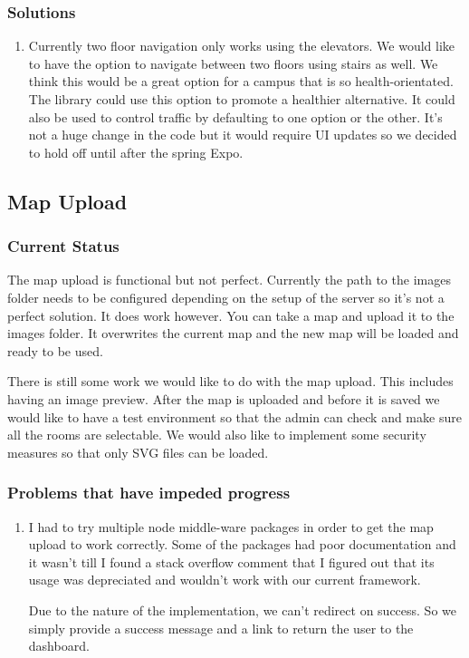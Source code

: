 \documentclass[letterpaper,10pt,serif,titlepage, onecolumn, compsoc]{IEEEtran}
\begin{document}
\subsubsection{Solutions}
{\begin{enumerate}
\item Currently two floor navigation only works using the elevators. We would like to have the option to navigate between two floors using stairs as well. We think this would be a great option for a campus that is so health-orientated. The library could use this option to promote a healthier alternative. It could also be used to control traffic by defaulting to one option or the other. It’s not a huge change in the code but it would require UI updates so we decided to hold off until after the spring Expo.
\end{enumerate}}



\subsection{Map Upload}
\subsubsection{Current Status}
The map upload is functional but not perfect. Currently the path to the images folder needs to be configured depending on the setup of the server so it’s not a perfect solution. It does work however. You can take a map and upload it to the images folder. It overwrites the current map and the new map will be loaded and ready to be used.

There is still some work we would like to do with the map upload. This includes having an image preview. After the map is uploaded and before it is saved we would like to have a test environment so that the admin can check and make sure all the rooms are selectable. We would also like to implement some security measures so that only SVG files can be loaded. 

\subsubsection{Problems that have impeded progress}
\begin{enumerate}
\item I had to try multiple node middle-ware packages in order to get the map upload to work correctly. Some of the packages had poor documentation and it wasn’t till I found a stack overflow comment that I figured out that its usage was depreciated and wouldn’t work with our current framework. 

Due to the nature of the implementation, we can’t redirect on success. So we simply provide a success message and a link to return the user to the dashboard. 
\end{enumerate}
\end{document}
